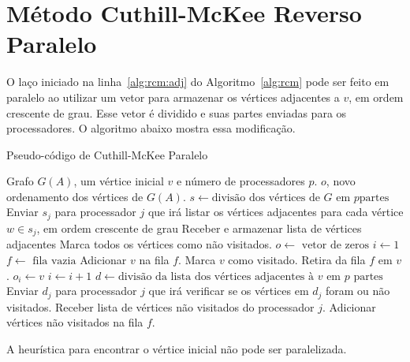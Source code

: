 \section{Método Cuthill-McKee Reverso Paralelo}
O laço iniciado na linha~\ref{alg:rcm:adj} do Algoritmo~\ref{alg:rcm} pode ser
feito em paralelo ao utilizar um vetor para armazenar os vértices adjacentes a
$v$, em ordem crescente de grau. Esse vetor é dividido e suas partes enviadas
para os processadores. O algoritmo abaixo mostra essa modificação.
\begin{algorithm}[hbt]
    \caption{Pseudo-código de Cuthill-McKee Paralelo}
    \label{alg:rcm}
    \begin{algorithmic}[1]
        \REQUIRE Grafo $G(A)$, um vértice inicial $v$ e número de processadores
        $p$.
        \ENSURE $o$, novo ordenamento dos vértices de $G(A)$.
        \STATE $s \longleftarrow \text{divisão dos vértices de $G$ em $p$
        partes}$
            \STATE Enviar $s_j$ para processador $j$ que irá listar os vértices
            adjacentes para cada vértice $w \in s_j$, em ordem crescente de grau
            \STATE Receber e armazenar lista de vértices adjacentes
        \ENDFOR
        \STATE Marca todos os vértices como não visitados.
        \STATE $o \longleftarrow \text{ vetor de zeros}$
        \STATE $i \longleftarrow 1$
        \STATE $f \longleftarrow \text{ fila vazia}$
        \STATE Adicionar $v$ na fila $f$.
        \STATE Marca $v$ como visitado.
            \STATE Retira da fila $f$ em $v$.
            \STATE $o_i \longleftarrow v$
            \STATE $i \longleftarrow i + 1$
            \STATE $d \longleftarrow \text{divisão da lista dos vértices
            adjacentes à $v$ em $p$ partes}$
                \STATE Enviar $d_j$ para processador $j$ que irá verificar se os
                vértices em $d_j$ foram ou não visitados.
                \STATE Receber lista de vértices não visitados do processador
                $j$.
            \ENDFOR
            \STATE Adicionar vértices não visitados na fila $f$.
        \ENDWHILE
    \end{algorithmic}
\end{algorithm}

A heurística para encontrar o vértice inicial não pode ser paralelizada.
